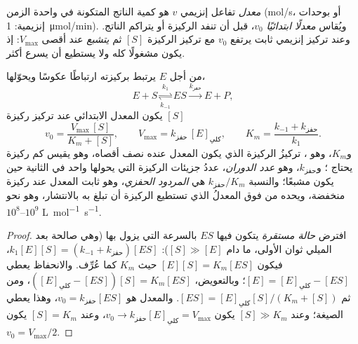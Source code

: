 \begin{definition}\label{def:b1:enzymes:rate}
\emph{معدل} تفاعل إنزيمي $v$ هو كمية الناتج
المتكونة في واحدة الزمن (\unit{mol/s}، أو بوحدات إنزيمية:
\qty{1}{\micro mol/min}). ويُقاس \emph{معدلًا ابتدائيًا} $v_0$، قبل
أن تنفد الركيزة أو يتراكم الناتج. وعند تركيز إنزيمي ثابت يرتفع $v_0$
مع تركيز الركيزة $[S]$ ثم \emph{يتشبع} عند أقصى $V_{\max}$: إذ يكون
 مشغولًا كله ولا يستطيع أن يسرع أكثر.
\end{definition}

\begin{theorem}\label{thm:b1:enzymes:mm}
من أجل  $E$ يرتبط بركيزته ارتباطًا عكوسًا ويحوّلها،
\[
E + S \underset{k_{-1}}{\overset{k_1}{\rightleftharpoons}} ES
\overset{k_{\text{حفز}}}{\longrightarrow} E + P ,
\]
يكون المعدل الابتدائي عند تركيز ركيزة $[S]$
\[
v_0 = \frac{V_{\max}\,[S]}{K_m + [S]}, \qquad V_{\max} = k_{\text{حفز}}\,[E]_{\text{كلي}},
\qquad K_m = \frac{k_{-1} + k_{\text{حفز}}}{k_1} .
\]
و$K_m$، وهو \emph{}، تركيزُ الركيزة الذي يكون المعدل
عنده نصف أقصاه، وهو يقيس كم ركيزة يحتاج ؛ و$k_{\text{حفز}}$،
وهو \emph{عدد الدوران}، عددُ جزيئات الركيزة التي
يحولها  واحد في الثانية حين يكون مشبعًا؛ والنسبة
$k_{\text{حفز}}/K_m$ هي \emph{المردود الحفزي}، وهو ثابت المعدل عند
ركيزة منخفضة، ويحده من فوق المعدلُ الذي تستطيع الركيزة أن تبلغ به
 بالانتشار، وهو نحو
$10^8$--$10^9$ \unit{L.mol^{-1}.s^{-1}}.
\end{theorem}
\begin{proof}
افترض \emph{حالة مستقرة} يتكون فيها $ES$ بالسرعة التي يزول بها
(وهي صالحة بعد الميلي ثوان الأولى، ما دام $[S] \gg [E]$):
$k_1[E][S] = (k_{-1} + k_{\text{حفز}})[ES]$، فيكون $[E][S] = K_m[ES]$
حيث $K_m$ كما عُرِّف. والانحفاظ يعطي $[E] = [E]_{\text{كلي}} -
[ES]$؛ وبالتعويض، $([E]_{\text{كلي}} - [ES])[S] = K_m[ES]$، ومن ثم
$[ES] = [E]_{\text{كلي}}[S]/(K_m + [S])$. والمعدل هو
$v_0 = k_{\text{حفز}}[ES]$، وهذا يعطي الصيغة؛ وعند $[S] \gg K_m$
يكون $v_0 \to k_{\text{حفز}}[E]_{\text{كلي}} = V_{\max}$، وعند
$[S] = K_m$ يكون $v_0 = V_{\max}/2$.
\end{proof}


